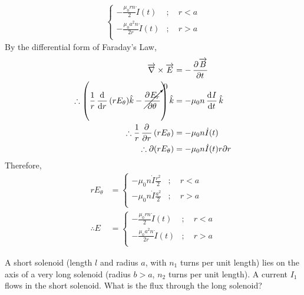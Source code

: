 \documentclass[fleqn, a4paper, 12pt, twoside]{article}
\theoremstyle{definition}
\theoremstyle{theorem}
\begin{document}
\begin{solution}
\begin{align*}
			\begin{cases}
				-\frac{\mu_0 r n}{2} \dot{I}(t)     & ;\quad r < a \\
				-\frac{\mu_0 a^2 n}{2 r} \dot{I}(t) & ;\quad r > a \\
			\end{cases}
	\end{align*}
	By the differential form of Faraday's Law,
	\begin{align*}
		\overrightarrow{\nabla} \times \overrightarrow{E}                                                               & = -\dpd{\overrightarrow{B}}{t}     \\
		\therefore \left( \frac{1}{r} \dod{}{r}(r E_{\theta}) \hat{k} - \cancelto{0}{\dpd{E_r}{\theta}} \right) \hat{k} & = -\mu_0 n \dod{I}{t} \hat{k}      \\
		\therefore \frac{1}{r} \dpd{}{r}(r E_{\theta})                                                                  & = -\mu_0 n \dot{I}(t)              \\
		\therefore \partial(r E_{\theta})                                                                               & = -\mu_0 n \dot{I}(t) r \partial r \\
	\end{align*}
	Therefore,
	\begin{align*}
		r E_{\theta} &=
			\begin{cases}
				-\mu_0 n \dot{I} \frac{r^2}{2} & ;\quad r < a \\
				-\mu_0 n \dot{I} \frac{a^2}{2} & ;\quad r > a \\
			\end{cases}\\
		\therefore E &=
			\begin{cases}
				-\frac{\mu_0 r n}{2} \dot{I}(t)     & ;\quad r < a \\
				-\frac{\mu_0 a^2 n}{2 r} \dot{I}(t) & ;\quad r > a \\
			\end{cases}
	\end{align*}
\end{solution}

\addtocounter{question}{2}
\begin{question}
	A short solenoid (length $l$ and radius $a$, with $n_1$ turns per unit length) lies on the axis of a very long solenoid (radius $b > a$, $n_2$ turns per unit length).
	A current $I_1$ flows in the short solenoid.
	What is the flux through the long solenoid?
\end{question}
\end{document}
